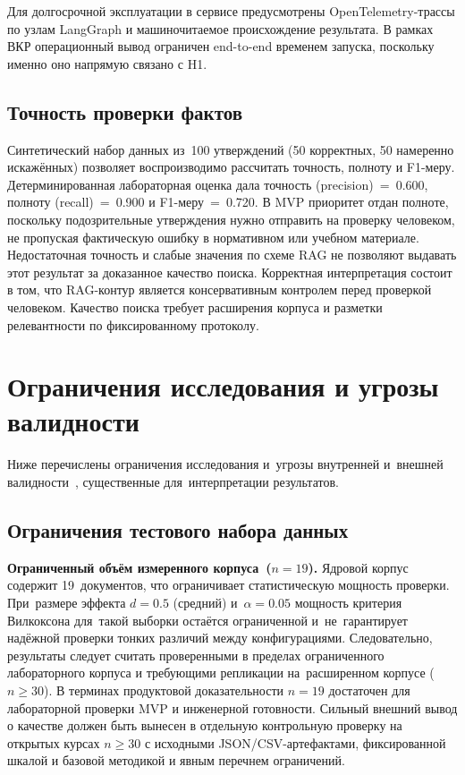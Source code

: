 Для долгосрочной эксплуатации в сервисе предусмотрены OpenTelemetry-трассы
по узлам LangGraph и машиночитаемое происхождение результата. В рамках ВКР
операционный вывод ограничен end-to-end временем запуска, поскольку
именно оно напрямую связано с H1.

\subsection{Точность проверки фактов}

Синтетический набор данных из~100 утверждений (50 корректных,
50 намеренно искажённых) позволяет воспроизводимо рассчитать
точность, полноту и F1-меру. Детерминированная лабораторная оценка дала
точность (precision)~=~0.600, полноту (recall)~=~0.900 и F1-меру~=~0.720.
В MVP приоритет отдан полноте, поскольку подозрительные утверждения нужно отправить
на проверку человеком, не пропуская фактическую ошибку в нормативном или учебном материале.
Недостаточная точность и слабые значения по схеме RAG не позволяют выдавать этот
результат за доказанное качество поиска. Корректная интерпретация состоит в том,
что RAG-контур является консервативным контролем перед проверкой человеком.
Качество поиска требует расширения корпуса и разметки релевантности по
фиксированному протоколу.

\section{Ограничения исследования и угрозы валидности}
\label{sec:limitations}

Ниже перечислены ограничения исследования и~угрозы
внутренней и~внешней валидности~\cite{wohlin_experimentation_2012},
существенные для~интерпретации результатов.

\subsection{Ограничения тестового набора данных}

\textbf{Ограниченный объём измеренного корпуса~($n = 19$).}
Ядровой корпус содержит 19~документов, что ограничивает
статистическую мощность проверки.
При~размере эффекта $d = 0.5$ (средний) и~$\alpha = 0.05$
мощность критерия Вилкоксона для~такой выборки остаётся ограниченной
и~не~гарантирует надёжной проверки тонких различий между конфигурациями.
Следовательно, результаты следует считать проверенными
в пределах ограниченного лабораторного корпуса и требующими репликации
на~расширенном корпусе ($n \geq 30$).
В терминах продуктовой доказательности $n = 19$ достаточен для
лабораторной проверки MVP и инженерной готовности.
Сильный внешний вывод о качестве должен быть вынесен в
отдельную контрольную проверку на открытых курсах $n \geq 30$
с исходными JSON/CSV-артефактами, фиксированной шкалой и базовой методикой
и явным перечнем ограничений.


